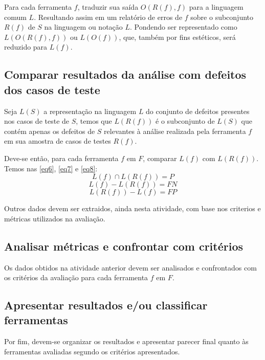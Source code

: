 Para cada ferramenta $f$, traduzir sua saída $O(R(f), f)$ para a linguagem comum $L$. Resultando assim em um relatório de erros de $f$ sobre o subconjunto $R(f)$ de $S$ na linguagem ou notação $L$. Pondendo ser representado como $L(O(R(f), f))$ ou $L(O(f))$, que, também por fins estéticos, será reduzido para $L(f)$.

\subsection{Comparar resultados da análise com defeitos dos casos de  teste}

Seja $L(S)$ a representação na linguagem $L$ do conjunto de defeitos presentes nos casos de teste de $S$, temos que $L(R(f))$ é o subconjunto de $L(S)$ que contém apenas os defeitos de $S$ relevantes à análise realizada pela ferramenta $f$ em sua amostra de casos de testes $R(f)$.

Deve-se então, para cada ferramenta $f$ em $F$, comparar $L(f)$ com $L(R(f))$. Temos nas \eqref{eq6}, \eqref{eq7} e \eqref{eq8}:
\begin{equation}\label{eq6}
  L(f) \cap L(R(f)) = P
\end{equation}
\begin{equation}\label{eq7}
  L(f) - L(R(f)) = FN
\end{equation}
\begin{equation}\label{eq8}
  L(R(f)) - L(f) = FP
\end{equation}

Outros dados devem ser extraidos, ainda nesta atividade, com base nos criterios e métricas utilizados na avaliação.

\subsection{Analisar métricas e confrontar com critérios}

Os dados obtidos na atividade anterior devem ser analisados e confrontados com os critérios da avaliação para cada ferramenta $f$ em $F$.

\subsection{Apresentar resultados e/ou classificar ferramentas}

Por fim, devem-se organizar os resultados e apresentar parecer final quanto às ferramentas avaliadas segundo os critérios apresentados.
